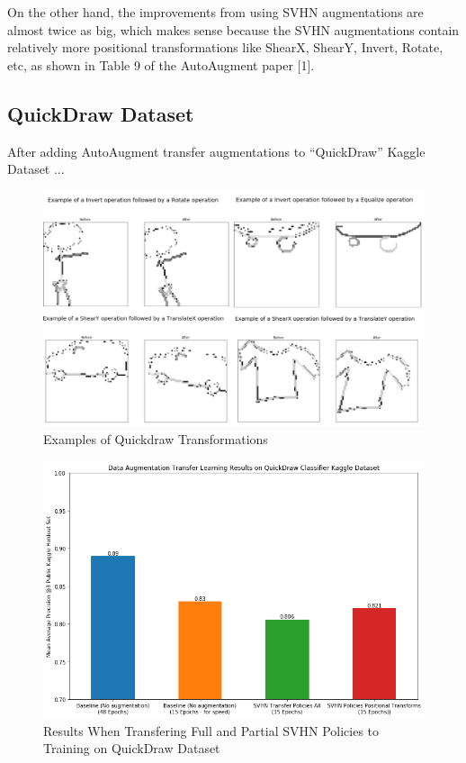 \documentclass[10pt,twocolumn,letterpaper]{article}
\begin{document}
On the other hand, the improvements from using SVHN augmentations are almost twice as big, which makes sense because the SVHN augmentations contain relatively more positional transformations like ShearX, ShearY, Invert, Rotate, etc, as shown in Table 9 of the AutoAugment paper [1].  



\subsection{QuickDraw Dataset}

After adding AutoAugment transfer augmentations to “QuickDraw” Kaggle Dataset ...

\begin{figure}[bhp]
\includegraphics[width=\columnwidth]{quickdraw_compiled_transform_exmples.png}
\caption{Examples of Quickdraw Transformations}
\end{figure}

\begin{figure}[bhp]
\includegraphics[width=\columnwidth]{quickdraw_results.png}
\caption{Results When Transfering Full and Partial SVHN Policies to Training on QuickDraw Dataset}
\end{figure}
\end{document}
